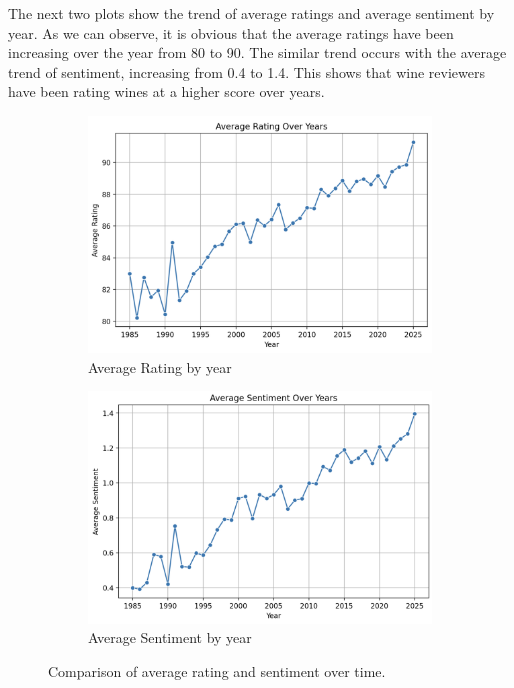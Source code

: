\documentclass{article}
\begin{document}
The next two plots show the trend of average ratings and average sentiment by year. As we can observe, it is obvious that the average ratings have been increasing over the year from 80 to 90. The similar trend occurs with the average trend of sentiment, increasing from 0.4 to 1.4. This shows that wine reviewers have been rating wines at a higher score over years. 
\begin{figure}[!ht]
    \centering
    \begin{subfigure}[b]{0.45\linewidth}
        \centering
        \includegraphics[width=\linewidth]{average_rating.png}
        \caption{Average Rating by year}
        \label{fig:avg_rating}
    \end{subfigure}
    \hfill
    \begin{subfigure}[b]{0.45\linewidth}
        \centering
        \includegraphics[width=\linewidth]{average_sentiment.png}
        \caption{Average Sentiment by year}
        \label{fig:avg_sentiment}
    \end{subfigure}
    \caption{Comparison of average rating and sentiment over time.}
    \label{fig:avg_side_by_side}
\end{figure}
\end{document}
